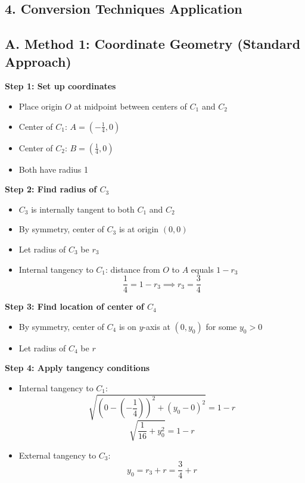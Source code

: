 \documentclass[11pt]{article}
\begin{document}
\begin{conversionbox}
\section*{4. Conversion Techniques Application}

\subsection*{A. Method 1: Coordinate Geometry (Standard Approach)}

\textbf{Step 1: Set up coordinates}
\begin{itemize}
    \item Place origin $O$ at midpoint between centers of $C_1$ and $C_2$
    \item Center of $C_1$: $A = (-\frac{1}{4}, 0)$
    \item Center of $C_2$: $B = (\frac{1}{4}, 0)$
    \item Both have radius 1
\end{itemize}

\textbf{Step 2: Find radius of $C_3$}
\begin{itemize}
    \item $C_3$ is internally tangent to both $C_1$ and $C_2$
    \item By symmetry, center of $C_3$ is at origin $(0, 0)$
    \item Let radius of $C_3$ be $r_3$
    \item Internal tangency to $C_1$: distance from $O$ to $A$ equals $1 - r_3$
    \[\frac{1}{4} = 1 - r_3 \implies r_3 = \frac{3}{4}\]
\end{itemize}

\textbf{Step 3: Find location of center of $C_4$}
\begin{itemize}
    \item By symmetry, center of $C_4$ is on $y$-axis at $(0, y_0)$ for some $y_0 > 0$
    \item Let radius of $C_4$ be $r$
\end{itemize}

\textbf{Step 4: Apply tangency conditions}
\begin{itemize}
    \item Internal tangency to $C_1$: 
    \[\sqrt{(0-(-\frac{1}{4}))^2 + (y_0-0)^2} = 1 - r\]
    \[\sqrt{\frac{1}{16} + y_0^2} = 1 - r\]
    
    \item External tangency to $C_3$:
    \[y_0 = r_3 + r = \frac{3}{4} + r\]
\end{itemize}


\end{conversionbox}
\end{document}
